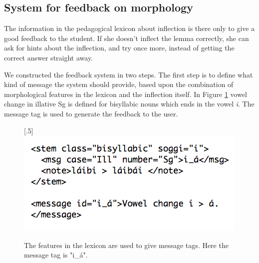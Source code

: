 \documentclass[11pt]{article}
\begin{document}
\subsection{System for feedback on morphology}\label{mfeedback}

The information in the pedagogical lexicon about inflection is there only to give a good feedback to the student. If she doesn't inflect the lemma correctly, she can ask for hints about the inflection, and try once more, instead of getting the correct answer straight away. 

We constructed the feedback system in two steps. The first step is to define what kind of message the system should provide, based upon the combination of morphological features in the lexicon and the inflection itself. In Figure \ref{feedbacknouns} vowel change in illative Sg is defined for bisyllabic nouns which ends in the vowel \textit{i}. The message tag is used to generate the feedback to the user. 

\begin{figure}[htbp]
\begin{center}
\scalebox{.5}[.5]{\includegraphics{presentation/img/morphfeedbackEng.png}}\\
\caption{The features in the lexicon are used to give message tags. Here the message tag is "i\_á".}
\label{feedbacknouns}
\end{center}
\end{figure}
\end{document}
